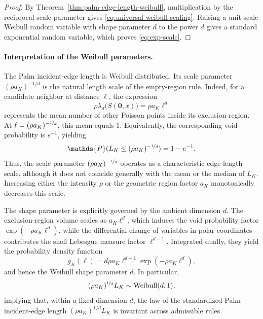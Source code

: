 \documentclass[a4paper,fleqn]{cas-dc}
\numberwithin{equation}{section}
\newcommand{\1}{\mathds{1}}
\newcommand{\0}{\mathbf{0}}
\begin{document}
\begin{proof}
By Theorem~\ref{thm:palm-edge-length-weibull}, multiplication by the reciprocal scale parameter gives \eqref{eq:universal-weibull-scaling}. Raising a unit-scale Weibull random variable with shape parameter $d$ to the power $d$ gives a standard exponential random variable, which proves \eqref{eq:exp-scale}.
\end{proof}


\paragraph{Interpretation of the Weibull parameters.}
The Palm incident-edge length is Weibull distributed.
Its scale parameter \((\rho a_K)^{-1/d}\) is the natural length scale
of the empty-region rule.
Indeed, for a candidate
neighbor at distance $\ell$, the expression
\begin{equation}\label{eq:mean_points}
\rho \lambda_d\bigl(S(\0, x)\bigr) = \rho a_K \ell^d
\end{equation}
represents the mean number of other Poisson points inside its exclusion region. At
$\ell = (\rho a_K)^{-\nicefrac{1}{d}}$, this mean equals $1$. Equivalently, the corresponding void
probability is $e^{-1}$, yielding
\begin{equation}\label{eq:void_probability}
\mathds{P}(L_K \leq (\rho a_K)^{-\nicefrac{1}{d}}) = 1 - e^{-1}.
\end{equation}
Thus, the scale parameter \((\rho a_K)^{-\nicefrac{1}{d}}\) operates as a characteristic 
edge-length scale, although it does not
coincide generally with the mean or the median of $L_K$. Increasing either the intensity 
$\rho$ or the geometric region factor $a_K$ monotonically decreases this scale.

The shape parameter is explicitly governed by the ambient dimension $d$. The exclusion-region
volume scales as $a_K \ell^d$, which induces the void probability factor
$\exp(-\rho a_K \ell^d)$, while the differential change of variables in polar coordinates 
contributes the shell Lebesgue measure factor $\ell^{d-1}$. Integrated dually, they yield the 
probability density function
\begin{equation}\label{eq:weibull_pdf}
g_K(\ell) = d \rho a_K \ell^{d-1} \exp\left(-\rho a_K \ell^d\right),
\end{equation}
and hence the Weibull shape parameter $d$. In particular,
\begin{equation}\label{eq:weibull_invariance}
(\rho a_K)^{\nicefrac{1}{d}} L_K \sim \operatorname{Weibull}(d, 1),
\end{equation}
implying that, within a fixed dimension \(d\), the law of the
standardized Palm incident-edge length
\((\rho a_K)^{1/d}L_K\) is invariant across admissible rules.
\end{document}
